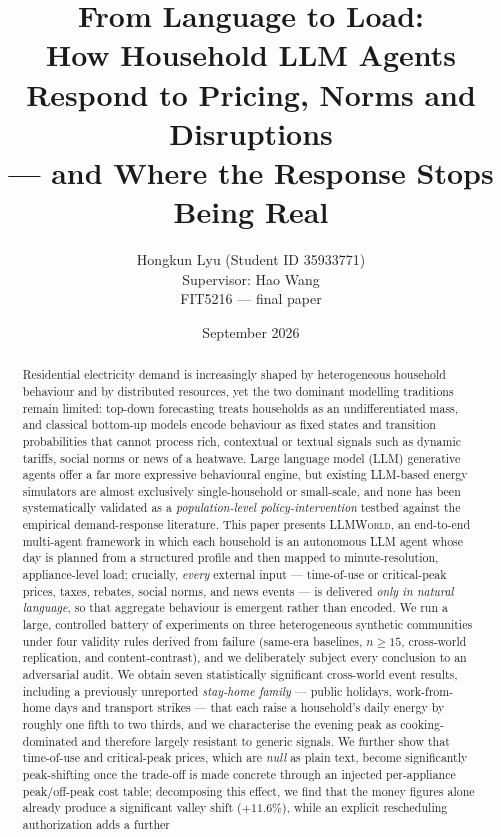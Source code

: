 \documentclass[11pt]{article}
\title{\bfseries From Language to Load:\\ How Household LLM Agents Respond to Pricing, Norms and Disruptions\\ --- and Where the Response Stops Being Real}
\author{Hongkun Lyu (Student ID 35933771)\\ Supervisor: Hao Wang\\ \small FIT5216 --- final paper}
\date{September 2026}
\begin{document}
\maketitle

\begin{abstract}
\noindent
Residential electricity demand is increasingly shaped by heterogeneous household behaviour and by
distributed resources, yet the two dominant modelling traditions remain limited: top-down forecasting
treats households as an undifferentiated mass, and classical bottom-up models encode behaviour as fixed
states and transition probabilities that cannot process rich, contextual or textual signals such as
dynamic tariffs, social norms or news of a heatwave. Large language model (LLM) generative agents offer a
far more expressive behavioural engine, but existing LLM-based energy simulators are almost exclusively
single-household or small-scale, and none has been systematically validated as a \emph{population-level
policy-intervention} testbed against the empirical demand-response literature. This paper presents
\textsc{LLMWorld}, an end-to-end multi-agent framework in which each household is an autonomous LLM agent
whose day is planned from a structured profile and then mapped to minute-resolution, appliance-level load;
crucially, \emph{every} external input --- time-of-use or critical-peak prices, taxes, rebates, social
norms, and news events --- is delivered \emph{only in natural language}, so that aggregate behaviour is
emergent rather than encoded. We run a large, controlled battery of experiments on three heterogeneous
synthetic communities under four validity rules derived from failure (same-era baselines, $n\ge15$,
cross-world replication, and content-contrast), and we deliberately subject every conclusion to an
adversarial audit. We obtain seven statistically significant cross-world event results, including a
previously unreported \emph{stay-home family} --- public holidays, work-from-home days and transport
strikes --- that each raise a household's daily energy by roughly one fifth to two thirds, and we
characterise the evening peak as cooking-dominated and therefore largely resistant to generic signals. We
further show that time-of-use and critical-peak prices, which are \emph{null} as plain text, become
significantly peak-shifting once the trade-off is made concrete through an injected per-appliance
peak/off-peak cost table; decomposing this effect, we find that the money figures alone already produce a
significant valley shift ($+11.6\%$), while an explicit rescheduling authorization adds a further

\end{abstract}
\end{document}
